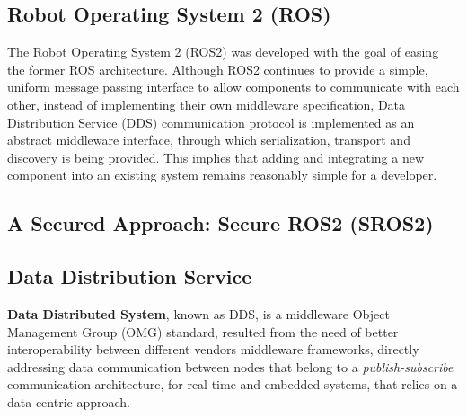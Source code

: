 
\subsection{Robot Operating System 2 (ROS)}


The Robot Operating System 2 (ROS2) was developed with the goal of easing the former ROS architecture. Although ROS2 continues to provide a simple, uniform message passing interface to allow components to communicate with each other, instead of implementing their own middleware specification, Data Distribution Service (DDS) communication protocol is implemented as an abstract middleware interface, through which serialization, transport and discovery is being provided. This implies that adding and integrating a new component into an existing system remains reasonably simple for a developer. 

\subsection{A Secured Approach: Secure ROS2 (SROS2)}

\subsection{Data Distribution Service}

\textbf{Data Distributed System}, known as DDS, is a middleware Object Management Group (OMG) standard, resulted from the need of better interoperability between different vendors middleware frameworks, directly addressing data communication between nodes that belong to a \textit{publish-subscribe} communication architecture, for real-time and embedded systems, that relies on a data-centric approach. 
            
